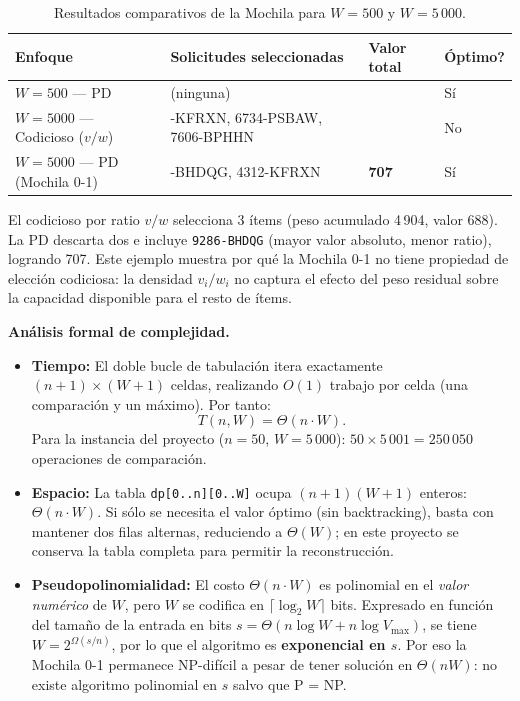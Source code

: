 \documentclass[11pt, a4paper]{article}
\begin{document}
\begin{table}[h!]
\centering\small
\begin{tabularx}{\textwidth}{
  >{\raggedright\arraybackslash}p{3.5cm}
  >{\raggedright\arraybackslash}X
  >{\centering\arraybackslash}p{1.8cm}
  >{\centering\arraybackslash}p{1.5cm}
}
\toprule
\textbf{Enfoque} & \textbf{Solicitudes seleccionadas} & \textbf{Valor total} & \textbf{Óptimo?} \\
\midrule
$W=500$ --- PD & (ninguna) & 0 & Sí \\
$W=5000$ --- Codicioso ($v/w$) & 4312-KFRXN, 6734-PSBAW, 7606-BPHHN & 688 & No \\
$W=5000$ --- PD (Mochila 0-1) & 9286-BHDQG, 4312-KFRXN & \textbf{707} & Sí \\
\bottomrule
\end{tabularx}
\caption{Resultados comparativos de la Mochila para $W=500$ y $W=5\,000$.}
\end{table}

El codicioso por ratio $v/w$ selecciona 3 ítems (peso acumulado 4\,904, valor 688).
La PD descarta dos e incluye \texttt{9286-BHDQG} (mayor valor absoluto, menor ratio),
logrando 707. Este ejemplo muestra por qué la Mochila 0-1 no tiene propiedad de elección
codiciosa: la densidad $v_i/w_i$ no captura el efecto del peso residual sobre la capacidad
disponible para el resto de ítems.

\textbf{Análisis formal de complejidad.}
\begin{itemize}
  \item \textbf{Tiempo:} El doble bucle de tabulación itera exactamente
        $(n+1)\times(W+1)$ celdas, realizando $O(1)$ trabajo por celda (una
        comparación y un máximo). Por tanto:
        \[
          T(n,W)=\Theta(n\cdot W).
        \]
        Para la instancia del proyecto ($n=50$, $W=5\,000$): $50\times5\,001=250\,050$
        operaciones de comparación.
  \item \textbf{Espacio:} La tabla \texttt{dp[0..n][0..W]} ocupa
        $(n+1)(W+1)$ enteros: $\Theta(n\cdot W)$. Si sólo se necesita
        el valor óptimo (sin backtracking), basta con mantener dos filas alternas,
        reduciendo a $\Theta(W)$; en este proyecto se conserva la tabla completa para
        permitir la reconstrucción.
  \item \textbf{Pseudopolinomialidad:} El costo $\Theta(n\cdot W)$ es polinomial en
        el \emph{valor numérico} de $W$, pero $W$ se codifica en $\lceil\log_2 W\rceil$
        bits. Expresado en función del tamaño de la entrada en bits
        $s=\Theta(n\log W + n\log V_{\max})$, se tiene $W=2^{\Omega(s/n)}$, por lo que
        el algoritmo es \textbf{exponencial en $s$}. Por eso la Mochila 0-1 permanece
        NP-difícil a pesar de tener solución en $\Theta(nW)$: no existe algoritmo
        polinomial en $s$ salvo que P = NP.
\end{itemize}
\end{document}
